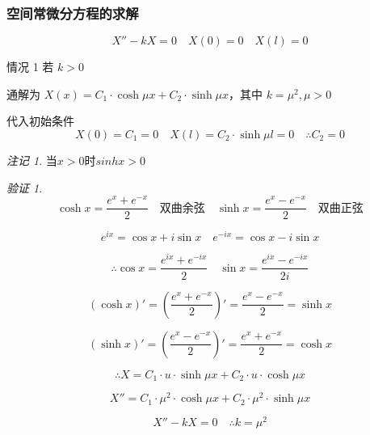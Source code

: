 \documentclass[12pt,a4paper]{article}
\numberwithin{subsection}{section}
\numberwithin{subsubsection}{subsection}
\theoremstyle{plain}
\theoremstyle{definition}
\theoremstyle{remark}
\newtheorem{remark}[theorem]{注记}
\newtheorem{verification}{验证}
\begin{document}
	\subsubsection{空间常微分方程的求解}
	\begin{equation}
		X'' - kX = 0 \quad X(0) = 0 \quad X(l) = 0
	\end{equation}
	
情况 1 \quad 若 \(k > 0\)

通解为 \(X(x) = C_1 \cdot \cosh \mu x + C_2 \cdot \sinh \mu x\)，其中 \(k = \mu^2,\mu>0\)
	
	代入初始条件 
	\begin{equation}
		X(0) = C_1 = 0 \quad X(l) = C_2 \cdot \sinh \mu l = 0 \quad \therefore C_2 = 0
	\end{equation}
	\begin{remark}
	当$x>0$时$sinhx>0$
	\end{remark}
	
	\begin{verification}	
		\begin{equation*}
			\cosh x = \frac{e^x + e^{-x}}{2} \quad \text{双曲余弦} \quad \sinh x = \frac{e^x - e^{-x}}{2} \quad \text{双曲正弦}
		\end{equation*}
		
		\begin{equation*}
			e^{ix} = \cos x + i \sin x \quad e^{-ix} = \cos x - i \sin x
		\end{equation*}
		
		\begin{equation*}
			\therefore \cos x = \frac{e^{ix} + e^{-ix}}{2} \quad \sin x = \frac{e^{ix} - e^{-ix}}{2i}
		\end{equation*}
		
		\begin{equation*}
			(\cosh x)' = \left( \frac{e^x + e^{-x}}{2} \right)' = \frac{e^x - e^{-x}}{2} = \sinh x
		\end{equation*}
		
		\begin{equation*}
			(\sinh x)' = \left( \frac{e^x - e^{-x}}{2} \right)' = \frac{e^x + e^{-x}}{2} = \cosh x
		\end{equation*}
		
		\begin{equation*}
			\therefore X = C_1 \cdot u \cdot \sinh \mu x + C_2 \cdot u \cdot \cosh \mu x
		\end{equation*}
		
		\begin{equation*}
			X'' = C_1 \cdot \mu^2 \cdot \cosh \mu x + C_2 \cdot \mu^2 \cdot \sinh \mu x
		\end{equation*}
		
		\begin{equation*}
			X'' - kX = 0 \quad \therefore k = \mu^2
		\end{equation*}
		
	\end{verification}	
	
\end{document}
